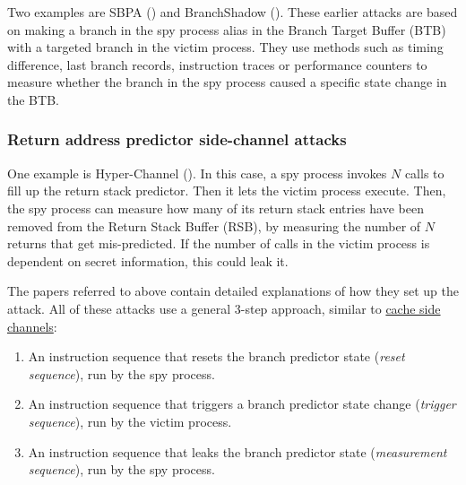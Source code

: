 \documentclass[
  a4paper,
]{report}
\providecommand{\tightlist}{%
  \setlength{\itemsep}{0pt}\setlength{\parskip}{0pt}}
\begin{document}
Two examples are
\label{__index_entry_156}{SBPA}
() and
\label{__index_entry_157}{BranchShadow}
(). These earlier attacks are
based on making a branch in the spy process alias in the
\label{__index_entry_158}{Branch Target Buffer
(BTB)} with a targeted branch in the
victim process. They use methods such as timing difference,
\label{__index_entry_159}{last branch
records},
\label{__index_entry_160}{instruction
traces} or
\label{__index_entry_161}{performance
counters} to measure whether the branch in
the spy process caused a specific state change in the BTB.

\subsubsection{Return address predictor side-channel
attacks}\label{return-address-predictor-side-channel-attacks}

\label{__index_entry_162}{}

One example is
\label{__index_entry_163}{Hyper-Channel}
(). In this case, a spy process
invokes \(N\) calls to fill up the return stack predictor. Then it lets
the victim process execute. Then, the spy process can measure how many
of its return stack entries have been removed from the Return Stack
Buffer (RSB), by measuring the number of \(N\) returns that get
mis-predicted. If the number of calls in the victim process is dependent
on secret information, this could leak it.

The papers referred to above contain detailed explanations of how they
set up the attack. All of these attacks use a general 3-step approach,
similar to \hyperref[general-schema-for-cache-covert-channels]{cache
side channels}:

\begin{enumerate}
\def\labelenumi{\arabic{enumi}.}
\tightlist
\item
  An instruction sequence that resets the branch predictor state
  (\emph{\label{__index_entry_164}{reset
  sequence}}), run by the spy process.
\item
  An instruction sequence that triggers a branch predictor state change
  (\emph{\label{__index_entry_165}{trigger
  sequence}}), run by the victim process.
\item
  An instruction sequence that leaks the branch predictor state
  (\emph{\label{__index_entry_166}{measurement
  sequence}}), run by the spy process.
\end{enumerate}
\end{document}
